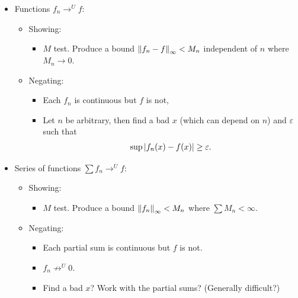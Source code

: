\begin{itemize}
\item
  Functions \(f_n \to^U f\):

  \begin{itemize}
  \tightlist
  \item
    Showing:

    \begin{itemize}
    \tightlist
    \item
      \(M\) test. Produce a bound \({\left\lVert {f_n - f} \right\rVert}_\infty < M_n\)
      independent of \(n\) where \(M_n \to 0\).
    \end{itemize}
  \item
    Negating:

    \begin{itemize}
    \tightlist
    \item
      Each \(f_n\) is continuous but \(f\) is not,
    \item
      Let \(n\) be arbitrary, then find a bad \(x\) (which can depend on
      \(n\)) and \(\varepsilon\) such that
      \begin{align*}
      \sup{{\left\lvert {f_n(x) - f(x)} \right\rvert}} \geq \varepsilon
      .\end{align*}
    \end{itemize}
  \end{itemize}
\item
  Series of functions \(\sum f_n \to^U f\):

  \begin{itemize}
  \tightlist
  \item
    Showing:

    \begin{itemize}
    \tightlist
    \item
      \(M\) test. Produce a bound \({\left\lVert {f_n} \right\rVert}_\infty < M_n\) where
      \(\sum M_n < \infty\).
    \end{itemize}
  \item
    Negating:

    \begin{itemize}
    \tightlist
    \item
      Each partial sum is continuous but \(f\) is not.
    \item
      \(f_n \not\to^U 0\).
    \item
      Find a bad \(x\)? Work with the partial sums? (Generally
      difficult?)
    \end{itemize}
  \end{itemize}
\end{itemize}


